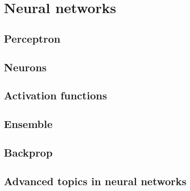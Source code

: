 \chapter{Neural networks}
\label{chap:nerual:nets}


\section{Perceptron}



\section{Neurons}



\section{Activation functions}



\section{Ensemble}



\section{Backprop}



\section{Advanced topics in neural networks}


